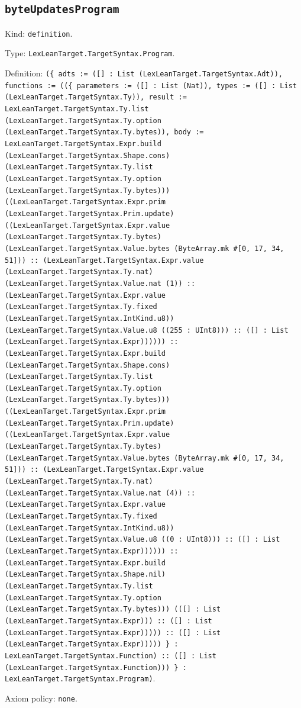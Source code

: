 \documentclass[11pt]{article}
\begin{document}
\subsection*{\texttt{byteUpdatesProgram}}
\noindent Kind: \texttt{definition}.\par
\noindent Type: \texttt{LexLeanTarget.TargetSyntax.Program}.\par
\noindent Definition: \texttt{(\{ adts := ([] : List (LexLeanTarget.TargetSyntax.Adt)), functions := ((\{ parameters := ([] : List (Nat)), types := ([] : List (LexLeanTarget.TargetSyntax.Ty)), result := LexLeanTarget.TargetSyntax.Ty.list (LexLeanTarget.TargetSyntax.Ty.option (LexLeanTarget.TargetSyntax.Ty.bytes)), body := LexLeanTarget.TargetSyntax.Expr.build (LexLeanTarget.TargetSyntax.Shape.cons) (LexLeanTarget.TargetSyntax.Ty.list (LexLeanTarget.TargetSyntax.Ty.option (LexLeanTarget.TargetSyntax.Ty.bytes))) ((LexLeanTarget.TargetSyntax.Expr.prim (LexLeanTarget.TargetSyntax.Prim.update) ((LexLeanTarget.TargetSyntax.Expr.value (LexLeanTarget.TargetSyntax.Ty.bytes) (LexLeanTarget.TargetSyntax.Value.bytes (ByteArray.mk \#[0, 17, 34, 51])) :: (LexLeanTarget.TargetSyntax.Expr.value (LexLeanTarget.TargetSyntax.Ty.nat) (LexLeanTarget.TargetSyntax.Value.nat (1)) :: (LexLeanTarget.TargetSyntax.Expr.value (LexLeanTarget.TargetSyntax.Ty.fixed (LexLeanTarget.TargetSyntax.IntKind.u8)) (LexLeanTarget.TargetSyntax.Value.u8 ((255 : UInt8))) :: ([] : List (LexLeanTarget.TargetSyntax.Expr)))))) :: (LexLeanTarget.TargetSyntax.Expr.build (LexLeanTarget.TargetSyntax.Shape.cons) (LexLeanTarget.TargetSyntax.Ty.list (LexLeanTarget.TargetSyntax.Ty.option (LexLeanTarget.TargetSyntax.Ty.bytes))) ((LexLeanTarget.TargetSyntax.Expr.prim (LexLeanTarget.TargetSyntax.Prim.update) ((LexLeanTarget.TargetSyntax.Expr.value (LexLeanTarget.TargetSyntax.Ty.bytes) (LexLeanTarget.TargetSyntax.Value.bytes (ByteArray.mk \#[0, 17, 34, 51])) :: (LexLeanTarget.TargetSyntax.Expr.value (LexLeanTarget.TargetSyntax.Ty.nat) (LexLeanTarget.TargetSyntax.Value.nat (4)) :: (LexLeanTarget.TargetSyntax.Expr.value (LexLeanTarget.TargetSyntax.Ty.fixed (LexLeanTarget.TargetSyntax.IntKind.u8)) (LexLeanTarget.TargetSyntax.Value.u8 ((0 : UInt8))) :: ([] : List (LexLeanTarget.TargetSyntax.Expr)))))) :: (LexLeanTarget.TargetSyntax.Expr.build (LexLeanTarget.TargetSyntax.Shape.nil) (LexLeanTarget.TargetSyntax.Ty.list (LexLeanTarget.TargetSyntax.Ty.option (LexLeanTarget.TargetSyntax.Ty.bytes))) (([] : List (LexLeanTarget.TargetSyntax.Expr))) :: ([] : List (LexLeanTarget.TargetSyntax.Expr))))) :: ([] : List (LexLeanTarget.TargetSyntax.Expr))))) \} : LexLeanTarget.TargetSyntax.Function) :: ([] : List (LexLeanTarget.TargetSyntax.Function))) \} : LexLeanTarget.TargetSyntax.Program)}.\par
\noindent Axiom policy: \texttt{none}.\par
\end{document}
